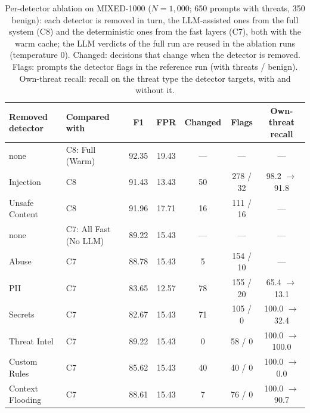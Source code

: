 \documentclass[runningheads]{llncs}
\newif\ifrev
\newcommand{\rev}[1]{\ifrev\hl{#1}\else#1\fi}                  %
\begin{document}
\begin{table}[h]
\centering
\scriptsize
\begin{tabular}{@{}llccccc@{}}
\toprule
\rev{\textbf{Removed detector}} & \rev{\textbf{Compared with}} & \rev{\textbf{F1}} & \rev{\textbf{FPR}} & \rev{\textbf{Changed}} & \rev{\textbf{Flags}} & \rev{\textbf{Own-threat recall}} \\
\midrule
\rev{none} & \rev{C8: Full (Warm)} & \rev{92.35} & \rev{19.43} & \rev{---} & \rev{---} & \rev{---} \\
\rev{Injection} & \rev{C8} & \rev{91.43} & \rev{13.43} & \rev{50} & \rev{278 / 32} & \rev{98.2 $\to$ 91.8} \\
\rev{Unsafe Content} & \rev{C8} & \rev{91.96} & \rev{17.71} & \rev{16} & \rev{111 / 16} & \rev{---} \\
\midrule
\rev{none} & \rev{C7: All Fast (No LLM)} & \rev{89.22} & \rev{15.43} & \rev{---} & \rev{---} & \rev{---} \\
\rev{Abuse} & \rev{C7} & \rev{88.78} & \rev{15.43} & \rev{5} & \rev{154 / 10} & \rev{---} \\
\rev{PII} & \rev{C7} & \rev{83.65} & \rev{12.57} & \rev{78} & \rev{155 / 20} & \rev{65.4 $\to$ 13.1} \\
\rev{Secrets} & \rev{C7} & \rev{82.67} & \rev{15.43} & \rev{71} & \rev{105 / 0} & \rev{100.0 $\to$ 32.4} \\
\rev{Threat Intel} & \rev{C7} & \rev{89.22} & \rev{15.43} & \rev{0} & \rev{58 / 0} & \rev{100.0 $\to$ 100.0} \\
\rev{Custom Rules} & \rev{C7} & \rev{85.62} & \rev{15.43} & \rev{40} & \rev{40 / 0} & \rev{100.0 $\to$ 0.0} \\
\rev{Context Flooding} & \rev{C7} & \rev{88.61} & \rev{15.43} & \rev{7} & \rev{76 / 0} & \rev{100.0 $\to$ 90.7} \\
\bottomrule
\end{tabular}
\caption{\protect\rev{Per-detector ablation on MIXED-1000 ($N=1{,}000$; 650 prompts with threats, 350 benign): each detector is removed in turn, the LLM-assisted ones from the full system (C8) and the deterministic ones from the fast layers (C7), both with the warm cache; the LLM verdicts of the full run are reused in the ablation runs (temperature 0). Changed: decisions that change when the detector is removed. Flags: prompts the detector flags in the reference run (with threats / benign). Own-threat recall: recall on the threat type the detector targets, with and without it.}}
\label{tab:loo}
\vspace{-7mm}
\end{table}
\end{document}
